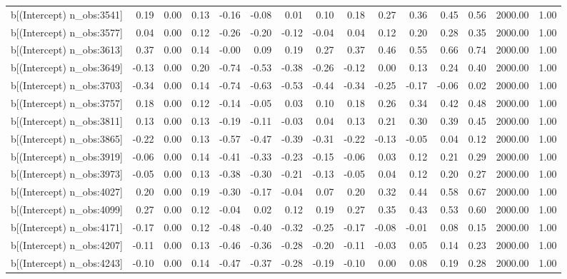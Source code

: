 \begin{table}[ht]
\begin{tabular}{rrrrrrrrrrrrrrr}
  b[(Intercept) n\_obs:3541] & 0.19 & 0.00 & 0.13 & -0.16 & -0.08 & 0.01 & 0.10 & 0.18 & 0.27 & 0.36 & 0.45 & 0.56 & 2000.00 & 1.00 \\ 
  b[(Intercept) n\_obs:3577] & 0.04 & 0.00 & 0.12 & -0.26 & -0.20 & -0.12 & -0.04 & 0.04 & 0.12 & 0.20 & 0.28 & 0.35 & 2000.00 & 1.00 \\ 
  b[(Intercept) n\_obs:3613] & 0.37 & 0.00 & 0.14 & -0.00 & 0.09 & 0.19 & 0.27 & 0.37 & 0.46 & 0.55 & 0.66 & 0.74 & 2000.00 & 1.00 \\ 
  b[(Intercept) n\_obs:3649] & -0.13 & 0.00 & 0.20 & -0.74 & -0.53 & -0.38 & -0.26 & -0.12 & 0.00 & 0.13 & 0.24 & 0.40 & 2000.00 & 1.00 \\ 
  b[(Intercept) n\_obs:3703] & -0.34 & 0.00 & 0.14 & -0.74 & -0.63 & -0.53 & -0.44 & -0.34 & -0.25 & -0.17 & -0.06 & 0.02 & 2000.00 & 1.00 \\ 
  b[(Intercept) n\_obs:3757] & 0.18 & 0.00 & 0.12 & -0.14 & -0.05 & 0.03 & 0.10 & 0.18 & 0.26 & 0.34 & 0.42 & 0.48 & 2000.00 & 1.00 \\ 
  b[(Intercept) n\_obs:3811] & 0.13 & 0.00 & 0.13 & -0.19 & -0.11 & -0.03 & 0.04 & 0.13 & 0.21 & 0.30 & 0.39 & 0.45 & 2000.00 & 1.00 \\ 
  b[(Intercept) n\_obs:3865] & -0.22 & 0.00 & 0.13 & -0.57 & -0.47 & -0.39 & -0.31 & -0.22 & -0.13 & -0.05 & 0.04 & 0.12 & 2000.00 & 1.00 \\ 
  b[(Intercept) n\_obs:3919] & -0.06 & 0.00 & 0.14 & -0.41 & -0.33 & -0.23 & -0.15 & -0.06 & 0.03 & 0.12 & 0.21 & 0.29 & 2000.00 & 1.00 \\ 
  b[(Intercept) n\_obs:3973] & -0.05 & 0.00 & 0.13 & -0.38 & -0.30 & -0.21 & -0.13 & -0.05 & 0.04 & 0.12 & 0.20 & 0.27 & 2000.00 & 1.00 \\ 
  b[(Intercept) n\_obs:4027] & 0.20 & 0.00 & 0.19 & -0.30 & -0.17 & -0.04 & 0.07 & 0.20 & 0.32 & 0.44 & 0.58 & 0.67 & 2000.00 & 1.00 \\ 
  b[(Intercept) n\_obs:4099] & 0.27 & 0.00 & 0.12 & -0.04 & 0.02 & 0.12 & 0.19 & 0.27 & 0.35 & 0.43 & 0.53 & 0.60 & 2000.00 & 1.00 \\ 
  b[(Intercept) n\_obs:4171] & -0.17 & 0.00 & 0.12 & -0.48 & -0.40 & -0.32 & -0.25 & -0.17 & -0.08 & -0.01 & 0.08 & 0.15 & 2000.00 & 1.00 \\ 
  b[(Intercept) n\_obs:4207] & -0.11 & 0.00 & 0.13 & -0.46 & -0.36 & -0.28 & -0.20 & -0.11 & -0.03 & 0.05 & 0.14 & 0.23 & 2000.00 & 1.00 \\ 
  b[(Intercept) n\_obs:4243] & -0.10 & 0.00 & 0.14 & -0.47 & -0.37 & -0.28 & -0.19 & -0.10 & 0.00 & 0.08 & 0.19 & 0.28 & 2000.00 & 1.00 \\ 

\end{tabular}
\end{table}
